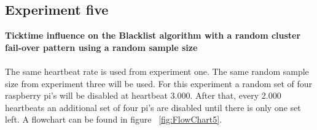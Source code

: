 \subsection{Experiment five}
\textbf{Ticktime influence on the Blacklist algorithm with a random cluster fail-over pattern using a random sample size}
\\~\\
The same heartbeat rate is used from experiment one. The same random sample size from experiment three will be used. For this experiment a random set of four raspberry pi's will be disabled at heartbeat 3.000. After that, every 2.000 heartbeats an additional set of four pi's are disabled until there is only one set left. A flowchart can be found in figure ~\ref{fig:FlowChart5}.

\begin{figure}[htb]
	\centering

\end{figure}
